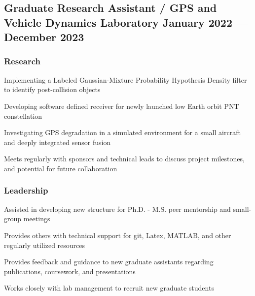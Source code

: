 \documentclass{article}
\begin{document}
\subsection{{Graduate Research Assistant / GPS and Vehicle Dynamics Laboratory \hfill January 2022 --- December 2023}}
\vspace{-0.2cm}
\subsubsection*{Research}
\vspace{-0.2cm}
\begin{zitemize}
    \item Implementing a Labeled Gaussian-Mixture Probability Hypothesis Density filter to identify post-collision objects
    \item Developing software defined receiver for newly launched low Earth orbit PNT constellation
    \item Investigating GPS degradation in a simulated environment for a small aircraft and deeply integrated sensor fusion
    \item Meets regularly with sponsors and technical leads to discuss project milestones, and potential for future collaboration
\end{zitemize}
\vspace{-0.6cm}
\subsubsection*{Leadership}
\vspace{-0.2cm}
\begin{zitemize}
    \item Assisted in developing new structure for Ph.D. {-} M.S. peer mentorship and small-group meetings
    \item Provides others with technical support for git, Latex, MATLAB, and other regularly utilized resources
    \item Provides feedback and guidance to new graduate assistants regarding publications, coursework, and presentations
    \item Works closely with lab management to recruit new graduate students 
\end{zitemize}
\end{document}
